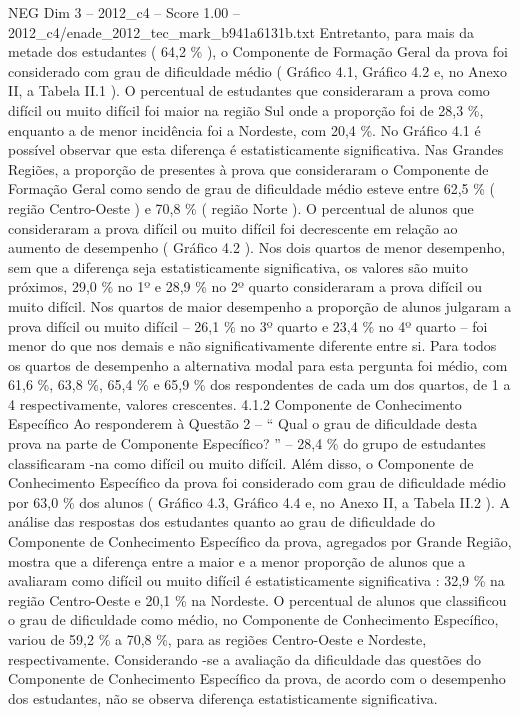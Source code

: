 \begin{textsample}{NEG Dim 3 – 2012\_c4 – Score 1.00 – 2012\_c4/enade\_2012\_tec\_mark\_b941a6131b.txt}
Entretanto, para mais da metade dos estudantes ( 64,2 \% ), o Componente de Formação Geral da prova foi considerado com grau de dificuldade médio ( Gráfico 4.1, Gráfico 4.2 e, no Anexo II, a Tabela II.1 ).
O percentual de estudantes que consideraram a prova como difícil ou muito difícil foi maior na região Sul onde a proporção foi de 28,3 \%, enquanto a de menor incidência foi a Nordeste, com 20,4 \%.
No Gráfico 4.1 é possível observar que esta diferença é estatisticamente significativa.
Nas Grandes Regiões, a proporção de presentes à prova que consideraram o Componente de Formação Geral como sendo de grau de dificuldade médio esteve entre 62,5 \% ( região Centro-Oeste ) e 70,8 \% ( região Norte ).
O percentual de alunos que consideraram a prova difícil ou muito difícil foi decrescente em relação ao aumento de desempenho ( Gráfico 4.2 ).
Nos dois quartos de menor desempenho, sem que a diferença seja estatisticamente significativa, os valores são muito próximos, 29,0 \% no 1º e 28,9 \% no 2º quarto consideraram a prova difícil ou muito difícil.
Nos quartos de maior desempenho a proporção de alunos julgaram a prova difícil ou muito difícil – 26,1 \% no 3º quarto e 23,4 \% no 4º quarto – foi menor do que nos demais e não significativamente diferente entre si.
Para todos os quartos de desempenho a alternativa modal para esta pergunta foi médio, com 61,6 \%, 63,8 \%, 65,4 \% e 65,9 \% dos respondentes de cada um dos quartos, de 1 a 4 respectivamente, valores crescentes. 4.1.2 Componente de Conhecimento Específico Ao responderem à Questão 2 – “ Qual o grau de dificuldade desta prova na parte de Componente Específico? ” – 28,4 \% do grupo de estudantes classificaram -na como difícil ou muito difícil.
Além disso, o Componente de Conhecimento Específico da prova foi considerado com grau de dificuldade médio por 63,0 \% dos alunos ( Gráfico 4.3, Gráfico 4.4 e, no Anexo II, a Tabela II.2 ).
A análise das respostas dos estudantes quanto ao grau de dificuldade do Componente de Conhecimento Específico da prova, agregados por Grande Região, mostra que a diferença entre a maior e a menor proporção de alunos que a avaliaram como difícil ou muito difícil é estatisticamente significativa : 32,9 \% na região Centro-Oeste e 20,1 \% na Nordeste.
O percentual de alunos que classificou o grau de dificuldade como médio, no Componente de Conhecimento Específico, variou de 59,2 \% a 70,8 \%, para as regiões Centro-Oeste e Nordeste, respectivamente.
Considerando -se a avaliação da dificuldade das questões do Componente de Conhecimento Específico da prova, de acordo com o desempenho dos estudantes, não se observa diferença estatisticamente significativa.

\end{textsample}
